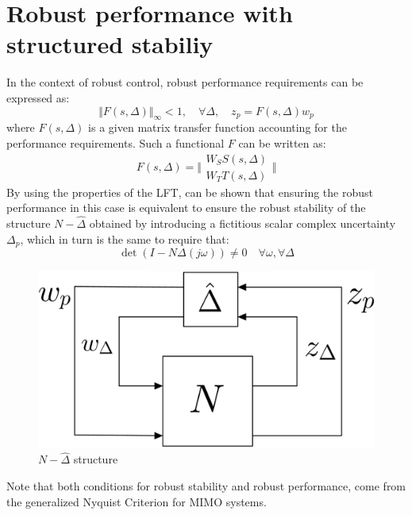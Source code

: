 \documentclass[a4paper, 12pt]{article}
\begin{document}
\section{Robust performance with structured stabiliy}
In the context of robust control, robust performance requirements can be expressed as: 
\begin{equation}
    \Vert F(s,\Delta) \Vert_\infty<1, \quad \forall\Delta, \quad
    z_p=F(s,\Delta)w_p
\end{equation}
where $F(s,\Delta)$ is a given matrix transfer function accounting for the performance requirements. Such a functional $F$ can be written as: 
\begin{equation}
    F(s,\Delta)=\bigg\Vert
        \begin{matrix}
            W_S S(s,\Delta)\\
            W_T T(s,\Delta)
        \end{matrix}
    \bigg\Vert 
\end{equation}
By using the properties of the LFT, can be shown that ensuring the robust performance in this case is equivalent to ensure the robust stability of the structure $N-\hat{\Delta}$ obtained by introducing a fictitious scalar complex uncertainty $\Delta_p$, which in turn is the same to require that:
\begin{equation}\label{eq:RP_cond}
    \det(I-N\Delta(j\omega))\ne 0 \quad \forall \omega, \forall \Delta
\end{equation}

\begin{figure}[h]
    \centering
    \includegraphics[scale=0.13]{img/NDeltahat.jpg}
    \caption{$N-\hat{\Delta}$ structure}
\end{figure}
Note that both conditions for robust stability and robust performance, come from the generalized Nyquist Criterion for MIMO systems.
\end{document}
